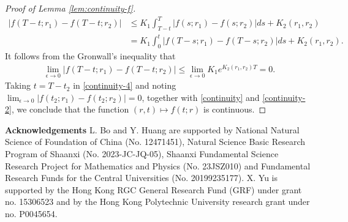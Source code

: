 \documentclass[11pt,times,letter]{article}
\numberwithin{equation}{section}
\begin{document}
\begin{proof}[Proof of Lemma \ref{lem:continuity-f}]
\begin{align*}
\left|f(T-t;r_1)-f(T-t;r_2)\right|&\leq K_1\int_{T-t}^T |f(s;r_1)-f(s;r_2)|ds+K_2(r_1,r_2)\nonumber\\
&=K_1\int_{0}^t |f(T-s;r_1)-f(T-s;r_2)|ds+K_2(r_1,r_2).
\end{align*}
It follows from the Gronwall's inequality that
\begin{align}\label{continuity-4}
\lim_{\epsilon \to 0}\left|f(T-t;r_1)-f(T-t;r_2)\right|\leq \lim_{\epsilon \to 0}K_1 e^{K_2(r_1,r_2)T}=0.
\end{align}
Taking $t=T-t_2$ in \eqref{continuity-4} and noting $\lim_{\epsilon \to 0}|f(t_2;r_1)-f(t_2;r_2)|=0$, together with \eqref{continuity} and \eqref{continuity-2}, we conclude that the function $(r,t)\mapsto f(t;r)$ is continuous.
\end{proof}


\noindent\textbf{Acknowledgements}  L. Bo and Y. Huang are supported by National Natural Science of Foundation of China (No. 12471451), Natural Science Basic Research Program of Shaanxi (No. 2023-JC-JQ-05), Shaanxi Fundamental Science Research Project for Mathematics and Physics (No. 23JSZ010) and Fundamental Research Funds for the Central Universities (No. 20199235177). X. Yu is supported by the Hong Kong RGC General Research Fund (GRF) under grant no. 15306523 and by the Hong Kong Polytechnic University research grant under no. P0045654. 
\end{document}
